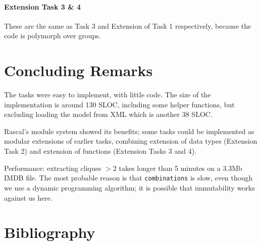 \documentclass[submission,copyright,creativecommons]{eptcs}
\begin{document}
\paragraph{Extension Task 3 \& 4}

These are the same as Task 3 and Extension of Task 1 respectively,
because the code is polymorph over groups.

\section{Concluding Remarks}

The tasks were easy to implement, with little code. The size of the
implementation is around 130 SLOC, including some helper functions,
but excluding loading the model from XML which is another 38 SLOC.

Rascal's module system showed its benefits; some tasks could be
implemented as modular extensions of earlier tasks, combining
extension of data types (Extension Task 2) and extension of functions
(Extension Tasks 3 and 4).

Performance: extracting cliques $> 2$ takes longer than 5 minutes on a
3.3Mb IMDB file. The most probable reason is that
\texttt{combinations} is slow, even though we use a dynamic
programming algorithm; it is possible that immutability works against
us here.

\section{Bibliography}

\nocite{*}


\end{document}
